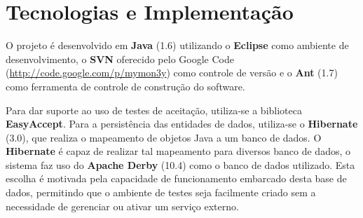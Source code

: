\documentclass[12pt]{article}
\begin{document}
\section{Tecnologias e Implementação}
\label{tecnologias}

O projeto é desenvolvido em \textbf{Java} (1.6) utilizando o \textbf{Eclipse} como ambiente de desenvolvimento, o \textbf{SVN} oferecido pelo Google Code (\url{http://code.google.com/p/mymon3y}) como controle de versão e o \textbf{Ant} (1.7) como ferramenta de controle de construção do software.

Para dar suporte ao uso de testes de aceitação, utiliza-se a biblioteca \textbf{EasyAccept}. Para a persistência das entidades de dados, utiliza-se o \textbf{Hibernate} (3.0), que realiza o mapeamento de objetos Java a um banco de dados. O \textbf{Hibernate} é capaz de realizar tal mapeamento para diversos banco de dados, o sistema faz uso do \textbf{Apache Derby} (10.4) como o banco de dados utilizado. Esta escolha é motivada pela capacidade de funcionamento embarcado desta base de dados, permitindo que o ambiente de testes seja facilmente criado sem a necessidade de gerenciar ou ativar um serviço externo.

%
%
\end{document}

